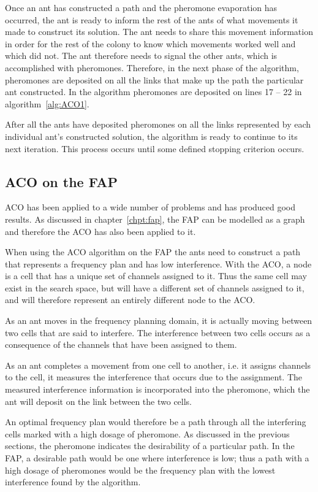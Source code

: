 Once an ant has constructed a path and the pheromone evaporation has occurred, the ant is ready to inform the rest of the ants of what movements it made to construct its solution. The ant needs to share this movement information in order for the rest of the colony to know which movements worked well and which did not. The ant therefore needs to signal the other ants, which is accomplished with pheromones. Therefore, in the next phase of the algorithm, pheromones are deposited on all the links that make up the path the particular ant constructed. In the algorithm pheromones are deposited on lines 17 -- 22 in algorithm~\ref{alg:ACO1}.

After all the ants have deposited pheromones on all the links represented by each individual ant's constructed solution, the algorithm is ready to continue to its next iteration. This process occurs until some defined stopping criterion occurs.

\subsection{ACO on the FAP}
ACO has been applied to a wide number of problems and has produced good results. As discussed in chapter~\ref{chpt:fap}, the FAP can be modelled as a graph and therefore the ACO has also been applied to it.

When using the ACO algorithm on the FAP the ants need to construct a path that represents a frequency plan and has low interference. With the ACO, a node is a cell that has a unique set of channels assigned to it. Thus the same cell may exist in the search space, but will have a different set of channels assigned to it, and will therefore represent an entirely different node to the ACO.

As an ant moves in the frequency planning domain, it is actually moving between two cells that are said to interfere. The interference between two cells occurs as a consequence of the channels that have been assigned to them. 

As an ant completes a movement from one cell to another, i.e. it assigns channels to the cell, it measures the interference that occurs due to the assignment.  The measured interference information is incorporated into the pheromone, which the ant will deposit on the link between the two cells.

An optimal frequency plan would therefore be a path through all the interfering cells marked with a high dosage of pheromone. As discussed in the previous sections, the pheromone indicates the desirability of a particular path. In the FAP, a desirable path would be one where interference is low; thus a path with a high dosage of pheromones would be the frequency plan with the lowest interference found by the algorithm.

